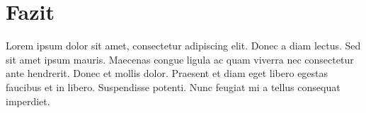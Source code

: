 \cleardoublepage
\section{Fazit}
\label{sec:Fazit}


Lorem ipsum dolor sit amet, consectetur adipiscing elit. Donec a diam lectus. Sed sit amet ipsum mauris. Maecenas congue ligula ac quam viverra nec consectetur ante hendrerit. Donec et mollis dolor. Praesent et diam eget libero egestas faucibus et in libero. Suspendisse potenti. Nunc feugiat mi a tellus consequat imperdiet.
